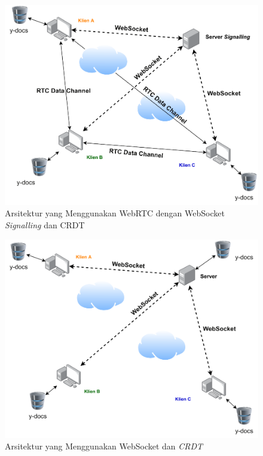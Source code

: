 \begin{figure}
    \centering
    \includegraphics[scale=0.65]{assets/skripsi/Arsitektur_WebRTC_CRDT}
    \caption{Arsitektur yang Menggunakan WebRTC dengan WebSocket \textit{Signalling} dan CRDT}
\end{figure}

\begin{figure}
    \centering
    \includegraphics[scale=0.65]{assets/skripsi/Arsitektur_WebSocket_CRDT}
    \caption{Arsitektur yang Menggunakan WebSocket dan \textit{CRDT}}
\end{figure}

